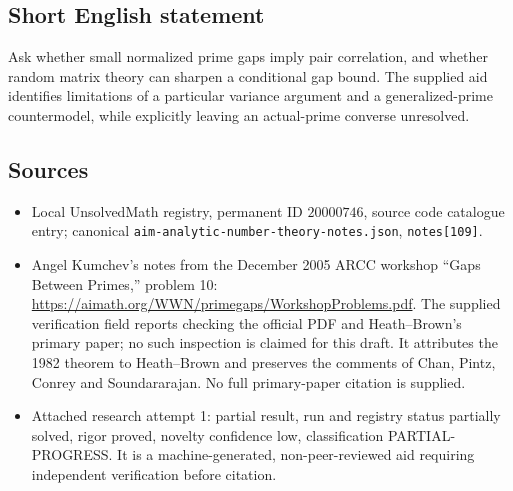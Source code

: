 \documentclass[11pt]{article}
\begin{document}
\subsection{Short English statement}
Ask whether small normalized prime gaps imply pair correlation, and whether random matrix theory can sharpen a conditional gap bound. The supplied aid identifies limitations of a particular variance argument and a generalized-prime countermodel, while explicitly leaving an actual-prime converse unresolved.
\subsection{Sources}
\begin{itemize}
\item Local UnsolvedMath registry, permanent ID $20000746$, source code catalogue entry; canonical \texttt{aim-analytic-number-theory-notes.json}, \texttt{notes[109]}.
\item Angel Kumchev's notes from the December 2005 ARCC workshop ``Gaps Between Primes,'' problem 10: \url{https://aimath.org/WWN/primegaps/WorkshopProblems.pdf}. The supplied verification field reports checking the official PDF and Heath--Brown's primary paper; no such inspection is claimed for this draft. It attributes the 1982 theorem to Heath--Brown and preserves the comments of Chan, Pintz, Conrey and Soundararajan. No full primary-paper citation is supplied.
\item Attached research attempt 1: partial result, run and registry status partially solved, rigor proved, novelty confidence low, classification PARTIAL-PROGRESS. It is a machine-generated, non-peer-reviewed aid requiring independent verification before citation.
\end{itemize}
\end{document}
